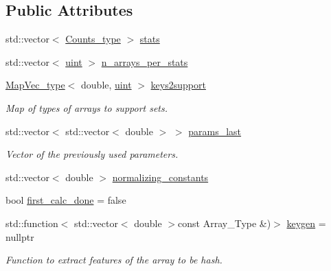 \subsection*{Public Attributes}
\begin{DoxyCompactItemize}
\item 
std\+::vector$<$ \hyperlink{typedefs_8hpp_aee40fa17c1fddb63dd1f2b1470ade95b}{Counts\+\_\+type} $>$ \hyperlink{class_model_abd7e36250a681bd2ade69d087e8200e1}{stats}
\item 
std\+::vector$<$ \hyperlink{typedefs_8hpp_a91ad9478d81a7aaf2593e8d9c3d06a14}{uint} $>$ \hyperlink{class_model_a410caeff58afe605520c878a0689abf5}{n\+\_\+arrays\+\_\+per\+\_\+stats}
\item 
\hyperlink{typedefs_8hpp_a02ed8dec96bc528c8bc3d8cb3c4674a5}{Map\+Vec\+\_\+type}$<$ double, \hyperlink{typedefs_8hpp_a91ad9478d81a7aaf2593e8d9c3d06a14}{uint} $>$ \hyperlink{class_model_a2a81190ac618b04479686411d02b3c5f}{keys2support}
\begin{DoxyCompactList}\small\item\em Map of types of arrays to support sets. \end{DoxyCompactList}\item 
std\+::vector$<$ std\+::vector$<$ double $>$ $>$ \hyperlink{class_model_add8183af946f2871480b6a6f9f1c8013}{params\+\_\+last}
\begin{DoxyCompactList}\small\item\em Vector of the previously used parameters. \end{DoxyCompactList}\item 
std\+::vector$<$ double $>$ \hyperlink{class_model_aa4479d146005e89350dad6ba7bd8121a}{normalizing\+\_\+constants}
\item 
bool \hyperlink{class_model_ae9cd143269b07c9bde44855d1974f3f5}{first\+\_\+calc\+\_\+done} = false
\item 
std\+::function$<$ std\+::vector$<$ double $>$const Array\+\_\+\+Type \&)$>$ \hyperlink{class_model_a16561e15c0abbb080927382b30d43e35}{keygen} = nullptr
\begin{DoxyCompactList}\small\item\em Function to extract features of the array to be hash. \end{DoxyCompactList}\end{DoxyCompactItemize}
